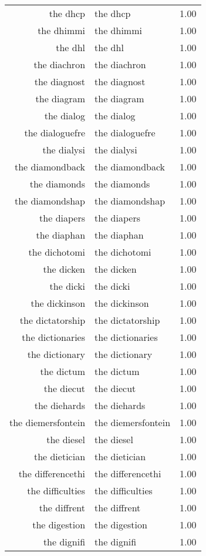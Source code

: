 \begin{table}[ht]
\begin{tabular}{rlr}
  the dhcp & the dhcp & 1.00 \\ 
  the dhimmi & the dhimmi & 1.00 \\ 
  the dhl & the dhl & 1.00 \\ 
  the diachron & the diachron & 1.00 \\ 
  the diagnost & the diagnost & 1.00 \\ 
  the diagram & the diagram & 1.00 \\ 
  the dialog & the dialog & 1.00 \\ 
  the dialoguefre & the dialoguefre & 1.00 \\ 
  the dialysi & the dialysi & 1.00 \\ 
  the diamondback & the diamondback & 1.00 \\ 
  the diamonds & the diamonds & 1.00 \\ 
  the diamondshap & the diamondshap & 1.00 \\ 
  the diapers & the diapers & 1.00 \\ 
  the diaphan & the diaphan & 1.00 \\ 
  the dichotomi & the dichotomi & 1.00 \\ 
  the dicken & the dicken & 1.00 \\ 
  the dicki & the dicki & 1.00 \\ 
  the dickinson & the dickinson & 1.00 \\ 
  the dictatorship & the dictatorship & 1.00 \\ 
  the dictionaries & the dictionaries & 1.00 \\ 
  the dictionary & the dictionary & 1.00 \\ 
  the dictum & the dictum & 1.00 \\ 
  the diecut & the diecut & 1.00 \\ 
  the diehards & the diehards & 1.00 \\ 
  the diemersfontein & the diemersfontein & 1.00 \\ 
  the diesel & the diesel & 1.00 \\ 
  the dietician & the dietician & 1.00 \\ 
  the differencethi & the differencethi & 1.00 \\ 
  the difficulties & the difficulties & 1.00 \\ 
  the diffrent & the diffrent & 1.00 \\ 
  the digestion & the digestion & 1.00 \\ 
  the dignifi & the dignifi & 1.00 \\ 

\end{tabular}
\end{table}
